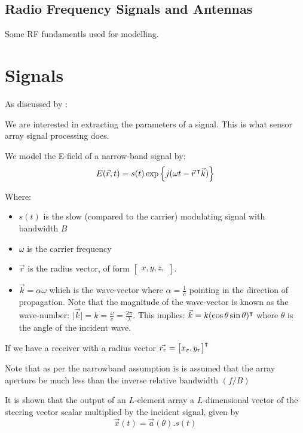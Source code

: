 \subsection{Radio Frequency Signals and Antennas}
Some RF fundamentls used for modelling.
\section{Signals}
As discussed by \cite{krim1996two}:

We are interested in extracting the parameters of a signal. This is what sensor array signal processing does.

We model the E-field of a narrow-band signal by:
\begin{equation}
  E(\vec{r}, t) = s(t) \exp \left\{ j(\omega t - \vec{r}\, ^\intercal \vec{k}) \right\}
\end{equation}

Where:
\begin{itemize}
  \item \(s(t)\) is the slow (compared to the carrier) modulating signal with bandwidth \(B\)
  \item \(\omega\) is the carrier frequency
  \item \( \vec{r} \) is the radius vector, of form \( \begin{bmatrix} x, y, z, \end{bmatrix} \).
  \item \(\vec{k} = \alpha\omega\) which is the wave-vector where \(\alpha = \frac{1}{c}\) pointing in the direction of propagation. Note that the magnitude of the wave-vector is known as the wave-number: \(\lvert \vec{k} \rvert = k = \frac{\omega}{c} = \frac{2\pi}{\lambda}\). This implies: \(\vec{k} = k(\cos\theta \sin\theta)^\intercal\) where \(\theta\) is the angle of the incident wave.
\end{itemize}

If we have a receiver with a radius vector \(\vec{r_r} = \begin{bmatrix} x_r, y_r \end{bmatrix}^\intercal\)

Note that as per the narrowband assumption is is assumed that the array aperture be much less than the inverse relative bandwidth \((f/B)\)

It is shown that the output of an \(L\)-element array a \(L\)-dimensional vector of the steering vector scalar multiplied by the incident signal, given by
\begin{equation}
  \vec{x}(t) = \vec{a}(\theta).s(t)
\end{equation}

